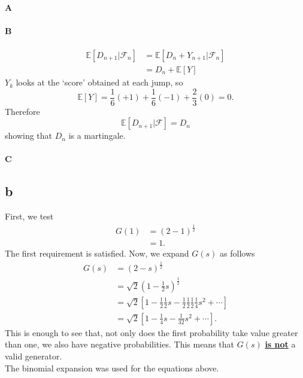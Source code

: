 \documentclass{article}
\newcommand{\E}{\mathbb{E}}
\begin{document}
\paragraph{A}


\paragraph{B}
\begin{align}
    \E[D_{n+1}\vert \mathcal{F}_n] &= \E[D_n+Y_{n+1}\vert \mathcal{F}_n] \\
    &= D_n + \E[Y] 
\end{align}
$Y_k$ looks at the `score' obtained at each jump, so
\begin{equation}
    \E[Y] = \frac{1}{6}(+1) + \frac{1}{6}(-1) + \frac{2}{3}(0) = 0.
\end{equation}
Therefore
\begin{equation}
    \E[D_{n+1}\vert\mathcal{F}] = D_n
\end{equation}
showing that $D_n$ is a martingale.

\paragraph{C}

\subsection{b}
First, we test
\begin{align}
    G(1) &= (2-1)^{\frac{1}{2}} \\
    &= 1.
\end{align}
The first requirement is satisfied. Now, we expand $G(s)$ as follows
\begin{align}
    G(s) &= (2-s)^{\frac{1}{2}} \\
    &= \sqrt{2}\left( 1-\frac{1}{2}s \right)^{\frac{1}{2}} \\
    &= \sqrt{2}\left[ 1 - \frac{1}{2}\frac{1}{2}s - \frac{1}{2}\frac{1}{2}\frac{1}{2}\frac{1}{4}s^2 + \cdots \right] \\
    &= \sqrt{2}\left[ 1 - \frac{1}{4}s - \frac{1}{32}s^2 + \cdots\right].
\end{align}
This is enough to see that, not only does the first probability take value greater than one, we also have negative probabilities. This means that $G(s)$ \underline{\textbf{is not}} a valid generator.\\
The binomial expansion was used for the equations above.
\end{document}
